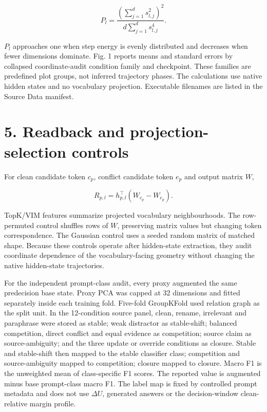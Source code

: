 \documentclass[10pt]{article}
\begin{document}
\begin{equation*}
P_l=\frac{(\sum_{j=1}^{d}s_{l,j}^2)^2}{d\sum_{j=1}^{d}s_{l,j}^4}.
\end{equation*}

\(P_l\) approaches one when step energy is evenly distributed and decreases when fewer dimensions dominate. Fig. 1 reports means and standard errors by collapsed coordinate-audit condition family and checkpoint. These families are predefined plot groups, not inferred trajectory phases. The calculations use native hidden states and no vocabulary projection. Executable filenames are listed in the Source Data manifest.

\section*{5. Readback and projection-selection controls}

For clean candidate token \(c_p\), conflict candidate token \(e_p\) and output matrix \(W\),

\begin{equation*}
R_{p,l}=h_{p,l}^{\top}(W_{c_p}-W_{e_p}).
\end{equation*}

TopK/VIM features summarize projected vocabulary neighbourhoods. The row-permuted control shuffles rows of \(W\), preserving matrix values but changing token correspondence. The Gaussian control uses a seeded random matrix of matched shape. Because these controls operate after hidden-state extraction, they audit coordinate dependence of the vocabulary-facing geometry without changing the native hidden-state trajectories.

For the independent prompt-class audit, every proxy augmented the same predecision base state. Proxy PCA was capped at 32 dimensions and fitted separately inside each training fold. Five-fold GroupKFold used relation graph as the split unit. In the 12-condition source panel, clean, rename, irrelevant and paraphrase were stored as stable; weak distractor as stable-shift; balanced competition, direct conflict and equal evidence as competition; source claim as source-ambiguity; and the three update or override conditions as closure. Stable and stable-shift then mapped to the stable classifier class; competition and source-ambiguity mapped to competition; closure mapped to closure. Macro F1 is the unweighted mean of class-specific F1 scores. The reported value is augmented minus base prompt-class macro F1. The label map is fixed by controlled prompt metadata and does not use \(\Delta U\), generated answers or the decision-window clean-relative margin profile.
\end{document}

